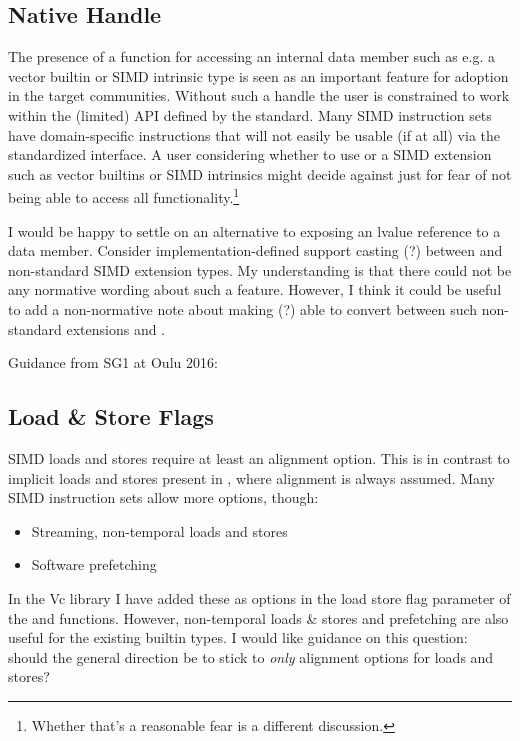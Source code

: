\subsection{Native Handle}\label{sec:native}
The presence of a  function for accessing an internal data member such as e.g. a vector builtin or SIMD intrinsic type is seen as an important feature for adoption in the target communities.
Without such a handle the user is constrained to work within the (limited) API defined by the standard.
Many SIMD instruction sets have domain-specific instructions that will not easily be usable (if at all) via the standardized interface.
A user considering whether to use \simd or a SIMD extension such as vector builtins or SIMD intrinsics might decide against \simd just for fear of not being able to access all functionality.\footnote{
  Whether that's a reasonable fear is a different discussion.
}

I would be happy to settle on an alternative to exposing an lvalue reference to a data member.
Consider implementation-defined support casting (?) between \simd and non-standard SIMD extension types.
My understanding is that there could not be any normative wording about such a feature.
However, I think it could be useful to add a non-normative note about making (?) able to convert between such non-standard extensions and \simd.

Guidance from SG1 at Oulu 2016:\\

\subsection{Load \& Store Flags}\label{sec:flags}
SIMD loads and stores require at least an alignment option.
This is in contrast to implicit loads and stores present in \CC{}, where alignment is always assumed.
Many SIMD instruction sets allow more options, though:
\begin{itemize}
  \item Streaming, non-temporal loads and stores
  \item Software prefetching
\end{itemize}
In the Vc library I have added these as options in the load store flag parameter of the  and  functions.
However, non-temporal loads \& stores and prefetching are also useful for the existing builtin types.
I would like guidance on this question: should the general direction be to stick to \emph{only} alignment options for \simd loads and stores?

